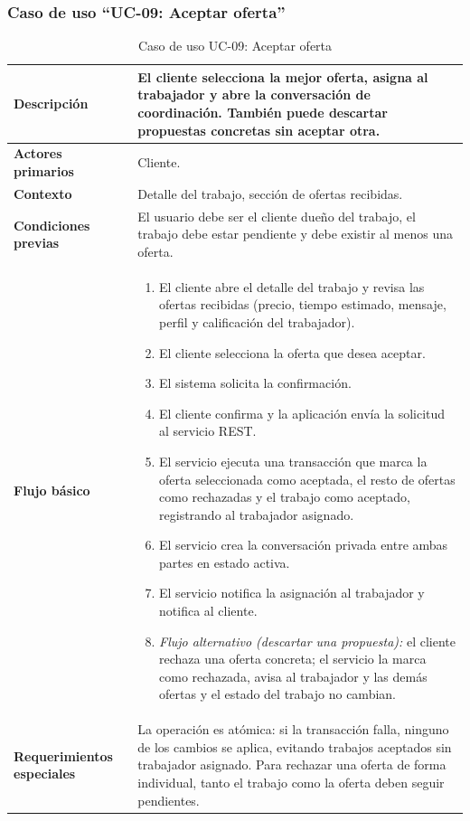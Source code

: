\documentclass[doc,12pt,a4paper]{apa7}
\begin{document}
\subsubsection{Caso de uso ``UC-09: Aceptar oferta''}

\begin{longtable}{|P{3.3cm}|L{11.2cm}|}
\caption{Caso de uso UC-09: Aceptar oferta}\\
\hline
\textbf{Descripción} & El cliente selecciona la mejor oferta, asigna al trabajador y abre la conversación de coordinación. También puede descartar propuestas concretas sin aceptar otra. \\ \hline
\textbf{Actores primarios} & Cliente. \\ \hline
\textbf{Contexto} & Detalle del trabajo, sección de ofertas recibidas. \\ \hline
\textbf{Condiciones previas} & El usuario debe ser el cliente dueño del trabajo, el trabajo debe estar pendiente y debe existir al menos una oferta. \\ \hline
\textbf{Flujo básico} &
\begin{enumerate}
    \item El cliente abre el detalle del trabajo y revisa las ofertas recibidas (precio, tiempo estimado, mensaje, perfil y calificación del trabajador).
    \item El cliente selecciona la oferta que desea aceptar.
    \item El sistema solicita la confirmación.
    \item El cliente confirma y la aplicación envía la solicitud al servicio REST.
    \item El servicio ejecuta una transacción que marca la oferta seleccionada como aceptada, el resto de ofertas como rechazadas y el trabajo como aceptado, registrando al trabajador asignado.
    \item El servicio crea la conversación privada entre ambas partes en estado activa.
    \item El servicio notifica la asignación al trabajador y notifica al cliente.
    \item \textit{Flujo alternativo (descartar una propuesta):} el cliente rechaza una oferta concreta; el servicio la marca como rechazada, avisa al trabajador y las demás ofertas y el estado del trabajo no cambian.
\end{enumerate} \\ \hline
\textbf{Requerimientos especiales} & La operación es atómica: si la transacción falla, ninguno de los cambios se aplica, evitando trabajos aceptados sin trabajador asignado. Para rechazar una oferta de forma individual, tanto el trabajo como la oferta deben seguir pendientes. \\ \hline

\end{longtable}
\end{document}
